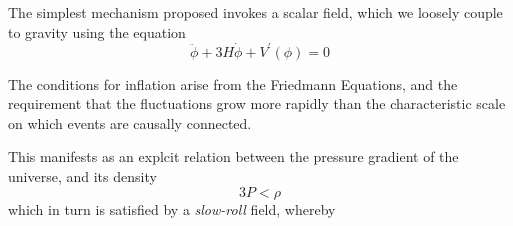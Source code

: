 The simplest mechanism proposed invokes a scalar field, which we loosely couple to gravity using the equation
\begin{equation}\label{eq:sclr_inf}
	\ddot{\phi} + 3 H \dot{\phi} + V^\prime(\phi) = 0
\end{equation}

The conditions for inflation arise from the Friedmann Equations, and the requirement that the fluctuations grow more rapidly than the characteristic scale on which events are causally connected.

This manifests as an explcit relation between the pressure gradient of the universe, and its density
\begin{equation}\label{eq:inf_cndtn}
	3 P < \rho
\end{equation}
which in turn is satisfied by a \emph{slow-roll} field, whereby

